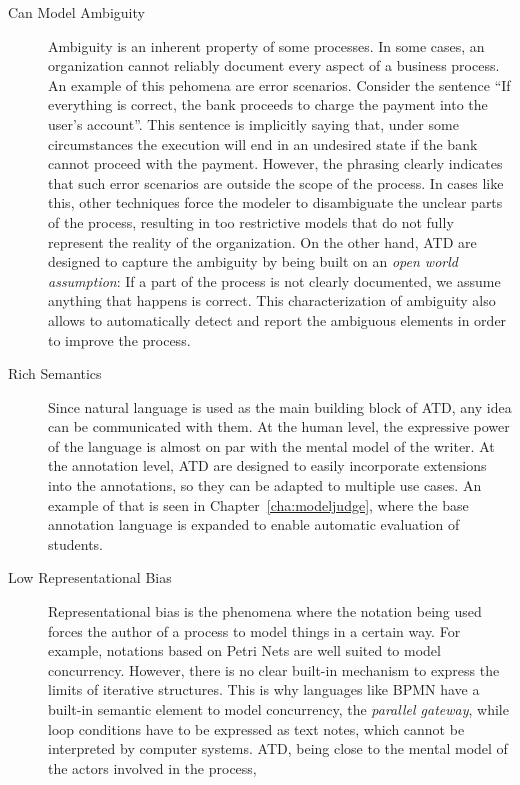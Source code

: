 \begin{description}
\item[Can Model Ambiguity] {Ambiguity is an inherent property of some processes.
    In some cases, an organization cannot reliably document every aspect of a
    business process. An example of this pehomena are error scenarios. Consider
    the sentence ``If everything is correct, the bank proceeds to charge the
    payment into the user's account''. This sentence is implicitly saying that,
    under some circumstances the execution will end in an undesired state if the
    bank cannot proceed with the payment. However, the phrasing clearly
    indicates that such error scenarios are outside the scope of the process. In
    cases like this, other techniques force the modeler to disambiguate the
    unclear parts of the process, resulting in too restrictive models that do
    not fully represent the reality of the organization. On the other hand, ATD
    are designed to capture the ambiguity by being built on an \emph{open
      world assumption}: If a part of the process is not clearly documented, we
    assume anything that happens is correct. This characterization of ambiguity
    also allows to automatically detect and report the ambiguous elements in
    order to improve the process.}
\item[Rich Semantics]{Since natural language is used as the main building block
    of ATD, any idea can be communicated with them. At the human level, the
    expressive power of the language is almost on par with the mental model of
    the writer. At the annotation level, ATD are designed to easily incorporate
    extensions into the annotations, so they can be adapted to multiple use
    cases. An example of that is seen in Chapter~\ref{cha:modeljudge}, where the
    base annotation language is expanded to enable automatic evaluation of
    students.}
\item[Low Representational Bias]{Representational bias is the phenomena where
    the notation being used forces the author of a process to model things in a
    certain way\cite{van2011representational}. For example, notations based on
    Petri Nets are well suited to model concurrency. However, there is no clear
    built-in mechanism to express the limits of iterative structures. This is
    why languages like BPMN have a built-in semantic element to model
    concurrency, the \emph{parallel gateway}, while loop conditions have to be
    expressed as text notes, which cannot be interpreted by computer systems.
    ATD, being close to the mental model of the actors involved in the process,
}
\end{description}
